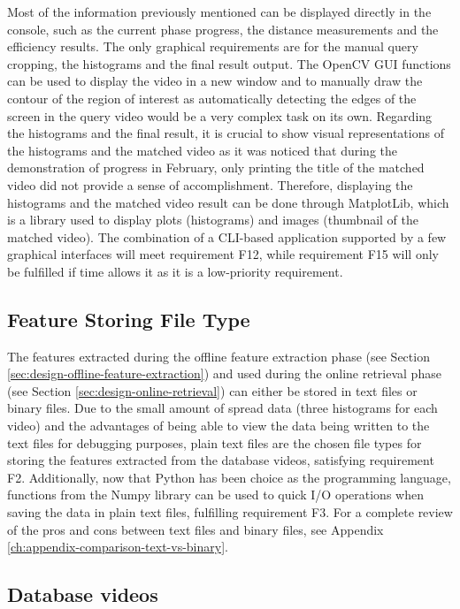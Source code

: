 Most of the information previously mentioned can be displayed directly in the console, such as the current phase progress, the distance measurements and the efficiency results. The only graphical requirements are for the manual query cropping, the histograms and the final result output. The OpenCV GUI functions can be used to display the video in a new window and to manually draw the contour of the region of interest as automatically detecting the edges of the screen in the query video would be a very complex task on its own. Regarding the histograms and the final result, it is crucial to show visual representations of the histograms and the matched video as it was noticed that during the demonstration of progress in February, only printing the title of the matched video did not provide a sense of accomplishment. Therefore, displaying the histograms and the matched video result can be done through MatplotLib, which is a library used to display plots (histograms) and images (thumbnail of the matched video). The combination of a CLI-based application supported by a few graphical interfaces will meet requirement F12, while requirement F15 will only be fulfilled if time allows it as it is a low-priority requirement.

\subsection{Feature Storing File Type}

The features extracted during the offline feature extraction phase (see Section \ref{sec:design-offline-feature-extraction}) and used during the online retrieval phase (see Section \ref{sec:design-online-retrieval}) can either be stored in text files or binary files. Due to the small amount of spread data (three histograms for each video) and the advantages of being able to view the data being written to the text files for debugging purposes, plain text files are the chosen file types for storing the features extracted from the database videos, satisfying requirement F2. Additionally, now that Python has been choice as the programming language, functions from the Numpy library can be used to quick I/O operations when saving the data in plain text files, fulfilling requirement F3. For a complete review of the pros and cons between text files and binary files, see Appendix \ref{ch:appendix-comparison-text-vs-binary}.\\

\subsection{Database videos}

